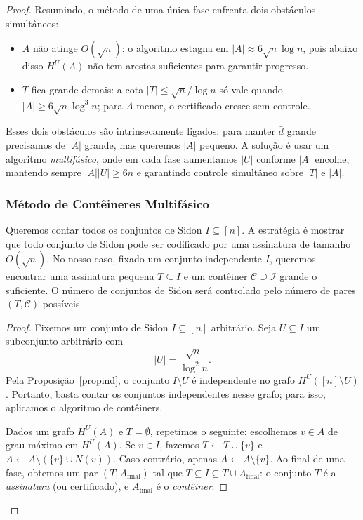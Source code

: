 \documentclass[reqno,a4paper,12pt]{amsart}
\begin{document}
\begin{proof}
  Resumindo, o método de uma única fase enfrenta dois obstáculos simultâneos:

  \begin{itemize}
    \item $A$ não atinge $O(\sqrt{n})$: o algoritmo estagna em
          $|A| \approx 6\sqrt{n}\log n$, pois abaixo disso $H^U(A)$ não tem
          arestas suficientes para garantir progresso.

    \item $T$ fica grande demais: a cota $|T| \leq \sqrt{n}/\log n$
          só vale quando $|A| \geq 6\sqrt{n}\log^3 n$; para $A$ menor, o certificado
          cresce sem controle.
  \end{itemize}

  Esses dois obstáculos são intrinsecamente ligados: para manter $\bar{d}$
  grande precisamos de $|A|$ grande, mas queremos $|A|$ pequeno.
  A solução é usar um algoritmo \emph{multifásico}, onde em cada fase
  aumentamos $|U|$ conforme $|A|$ encolhe, mantendo sempre
  $|A||U| \geq 6n$ e garantindo controle simultâneo sobre $|T|$ e $|A|$.

  \subsubsection{Método de Contêineres Multifásico}

  Queremos contar todos os conjuntos de Sidon $I \subseteq [n]$. A estratégia é mostrar que todo conjunto de Sidon pode ser codificado por uma assinatura de tamanho $O(\sqrt{n})$. No nosso caso, fixado um conjunto independente $I$, queremos encontrar uma assinatura pequena $T \subseteq I$ e um contêiner $\mathcal{C \supseteq I}$ grande o suficiente. O número de conjuntos de Sidon será controlado pelo número de pares $(T, \mathcal{C})$ possíveis.

  \begin{proof}
    Fixemos um conjunto de Sidon $I \subseteq [n]$ arbitrário. Seja $U \subseteq I$ um subconjunto arbitrário com
    \[
      |U| = \frac{\sqrt{n}}{\log^2 n}.
    \]
    Pela Proposição~\ref{propind}, o conjunto $I \setminus U$ é independente no grafo $H^U([n] \setminus U)$.
    Portanto, basta contar os conjuntos independentes nesse grafo; para isso, aplicamos o algoritmo de
    contêiners.

    Dados um grafo $H^U(A)$ e $T = \emptyset$, repetimos o seguinte: escolhemos $v \in A$ de grau máximo
    em $H^U(A)$. Se $v \in I$, fazemos $T \leftarrow T \cup \{v\}$ e $A \leftarrow A \setminus (\{v\} \cup N(v))$.
    Caso contrário, apenas $A \leftarrow A \setminus \{v\}$. Ao final de uma fase, obtemos um par
    $(T, A_{\text{final}})$ tal que $T \subseteq I \subseteq T \cup A_{\text{final}}$: o conjunto $T$ é a
    \emph{assinatura} (ou certificado), e $A_{\text{final}}$ é o \emph{contêiner}.


\end{proof}
\end{proof}
\end{document}
